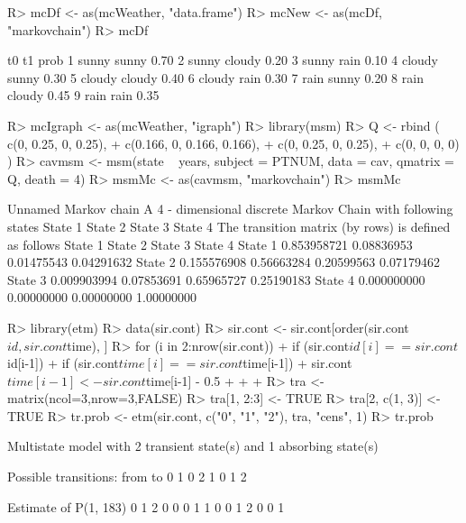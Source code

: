 \documentclass[nojss]{jss}
\begin{document}
\begin{Schunk}
\begin{Sinput}
R> mcDf <- as(mcWeather, "data.frame")
R> mcNew <- as(mcDf, "markovchain")
R> mcDf
\end{Sinput}
\begin{Soutput}
      t0     t1 prob
1  sunny  sunny 0.70
2  sunny cloudy 0.20
3  sunny   rain 0.10
4 cloudy  sunny 0.30
5 cloudy cloudy 0.40
6 cloudy   rain 0.30
7   rain  sunny 0.20
8   rain cloudy 0.45
9   rain   rain 0.35
\end{Soutput}
\begin{Sinput}
R> mcIgraph <- as(mcWeather, "igraph")
R> library(msm)
R> Q <- rbind ( c(0, 0.25, 0, 0.25),
+               c(0.166, 0, 0.166, 0.166),
+               c(0, 0.25, 0, 0.25),
+               c(0, 0, 0, 0) )
R> cavmsm <- msm(state ~ years, subject = PTNUM, data = cav, qmatrix = Q, death = 4)
R> msmMc <- as(cavmsm, "markovchain")
R> msmMc
\end{Sinput}
\begin{Soutput}
Unnamed Markov chain 
 A  4 - dimensional discrete Markov Chain with following states 
 State 1 State 2 State 3 State 4 
 The transition matrix   (by rows)  is defined as follows 
            State 1    State 2    State 3    State 4
State 1 0.853958721 0.08836953 0.01475543 0.04291632
State 2 0.155576908 0.56663284 0.20599563 0.07179462
State 3 0.009903994 0.07853691 0.65965727 0.25190183
State 4 0.000000000 0.00000000 0.00000000 1.00000000
\end{Soutput}
\begin{Sinput}
R> library(etm)
R> data(sir.cont)
R> sir.cont <- sir.cont[order(sir.cont$id, sir.cont$time), ]
R> for (i in 2:nrow(sir.cont)) {
+    if (sir.cont$id[i]==sir.cont$id[i-1]) {
+      if (sir.cont$time[i]==sir.cont$time[i-1]) {
+        sir.cont$time[i-1] <- sir.cont$time[i-1] - 0.5
+      }
+    }
+  }
R> tra <- matrix(ncol=3,nrow=3,FALSE)
R> tra[1, 2:3] <- TRUE
R> tra[2, c(1, 3)] <- TRUE
R> tr.prob <- etm(sir.cont, c("0", "1", "2"), tra, "cens", 1)
R> tr.prob
\end{Sinput}
\begin{Soutput}
Multistate model with 2 transient state(s)
 and 1 absorbing state(s)

Possible transitions:
 from to
    0  1
    0  2
    1  0
    1  2

Estimate of P(1, 183)
  0 1 2
0 0 0 1
1 0 0 1
2 0 0 1


\end{Soutput}
\end{Schunk}
\end{document}
